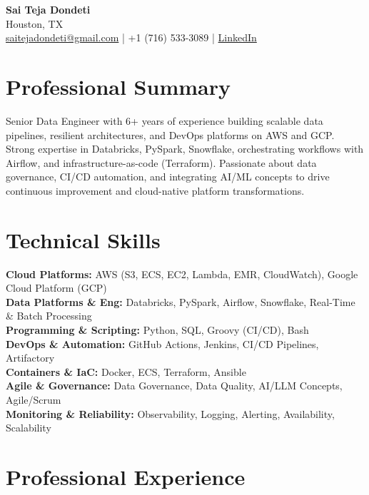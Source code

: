 \documentclass[10pt]{article}
\begin{document}
\begin{center}
    {\LARGE \textbf{Sai Teja Dondeti}} \\
    \vspace{2pt}
    Houston, TX \\
    \href{mailto:saitejadondeti@gmail.com}{saitejadondeti@gmail.com} \;|\;
    +1 (716) 533-3089 \;|\;
    \href{https://www.linkedin.com/in/sai-teja-dondeti/}{LinkedIn}
\end{center}

\section*{Professional Summary}
Senior Data Engineer with 6+ years of experience building scalable data pipelines, resilient architectures, and DevOps platforms on AWS and GCP. Strong expertise in Databricks, PySpark, Snowflake, orchestrating workflows with Airflow, and infrastructure-as-code (Terraform). Passionate about data governance, CI/CD automation, and integrating AI/ML concepts to drive continuous improvement and cloud-native platform transformations.

\section*{Technical Skills}

\textbf{Cloud Platforms:} AWS (S3, ECS, EC2, Lambda, EMR, CloudWatch), Google Cloud Platform (GCP) \\
\textbf{Data Platforms \& Eng:} Databricks, PySpark, Airflow, Snowflake, Real-Time \& Batch Processing \\
\textbf{Programming \& Scripting:} Python, SQL, Groovy (CI/CD), Bash \\
\textbf{DevOps \& Automation:} GitHub Actions, Jenkins, CI/CD Pipelines, Artifactory \\
\textbf{Containers \& IaC:} Docker, ECS, Terraform, Ansible \\
\textbf{Agile \& Governance:} Data Governance, Data Quality, AI/LLM Concepts, Agile/Scrum \\
\textbf{Monitoring \& Reliability:} Observability, Logging, Alerting, Availability, Scalability

\section*{Professional Experience}
\end{document}
